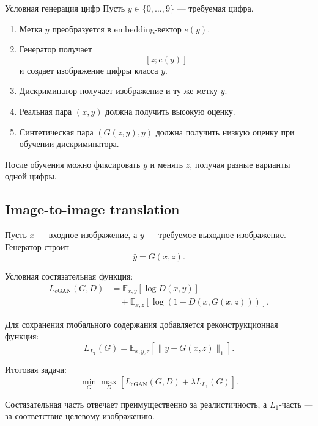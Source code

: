 \documentclass[12pt,a4paper]{article}
\newcommand{\E}{\mathbb{E}}
\numberwithin{equation}{section}
\theoremstyle{definition}
\theoremstyle{remark}
\begin{document}
\begin{examplebox}{Условная генерация цифр}
Пусть \(y\in\{0,\ldots,9\}\) --- требуемая цифра.

\begin{enumerate}
    \item Метка \(y\) преобразуется в embedding-вектор \(e(y)\).

    \item Генератор получает
    \[
        [z;e(y)]
    \]
    и создает изображение цифры класса \(y\).

    \item Дискриминатор получает изображение и ту же метку \(y\).

    \item Реальная пара \((x,y)\) должна получить высокую оценку.

    \item Синтетическая пара \((G(z,y),y)\) должна получить низкую
    оценку при обучении дискриминатора.
\end{enumerate}

После обучения можно фиксировать \(y\) и менять \(z\), получая разные
варианты одной цифры.
\end{examplebox}

\subsection{Image-to-image translation}

Пусть \(x\) --- входное изображение, а \(y\) --- требуемое выходное
изображение. Генератор строит
\[
    \widehat{y}=G(x,z).
\]

Условная состязательная функция:
\[
\begin{split}
    L_{\mathrm{cGAN}}(G,D)
    &=
    \E_{x,y}[\log D(x,y)]\\
    &\quad+
    \E_{x,z}
    [\log(1-D(x,G(x,z)))].
\end{split}
\]

Для сохранения глобального содержания добавляется реконструкционная
функция:
\[
    L_{L_1}(G)
    =
    \E_{x,y,z}
    \left[
        \|y-G(x,z)\|_1
    \right].
\]

Итоговая задача:
\[
    \min_G\max_D
    \left[
        L_{\mathrm{cGAN}}(G,D)
        +
        \lambda L_{L_1}(G)
    \right].
\]

Состязательная часть отвечает преимущественно за реалистичность, а
\(L_1\)-часть --- за соответствие целевому изображению.
\end{document}
